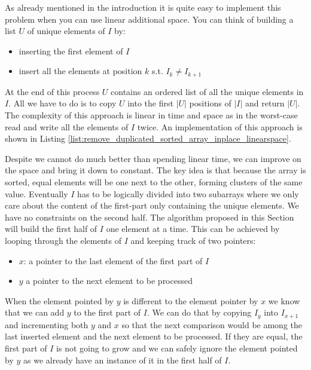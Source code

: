 As already mentioned in the introduction it is quite easy to implement this problem when you can use
linear additional space. You can think of building a list $U$ of unique elements of $I$ by:
\begin{itemize}
	\item inserting the first element of $I$
	\item insert all the elements at position $k$ s.t. $I_k \neq I_{k+1}$
\end{itemize}
At the end of this process $U$ contains an ordered list of all the unique elements in $I$. All we
have to do is to copy $U$ into the first $|U|$ positions of $|I|$ and return $|U|$. The complexity
of this approach is linear in time and space as in the worst-case read and write all the elements of
$I$ twice. An implementation of this approach is shown in Listing
\ref{list:remove_duplicated_sorted_array_inplace_linearspace}.

\begin{minipage}{\linewidth}
	
\end{minipage}

Despite we cannot do much better than spending linear time, we can improve on the space and bring it
down to constant. The key idea is that because the array is sorted, equal elements will be one next
to the other, forming clusters of the same value. Eventually $I$ has to be logically divided into
two subarrays where we only care about the content of the first-part only containing the unique
elements. We have no constraints on the second half. The algorithm proposed in this Section will
build the first half of $I$ one element at a time.  This can be achieved by looping through the
elements of $I$ and keeping track of two pointers:
\begin{itemize}
	\item $x$: a pointer to the last element of the first part of $I$
	\item $y$ a pointer to the next element to be processed 
\end{itemize}
When the element pointed by $y$ is different to the element pointer by $x$ we know that we can add
$y$ to the first part of $I$. We can do that by copying $I_y$ into $I_{x+1}$ and incrementing both
$y$ and $x$ so that the next comparison would be among the last inserted element and the next
element to be processed. If they are equal, the first part of $I$ is not going to grow and we can
safely ignore the element pointed by $y$ as we already have an instance of it in the first half of
$I$.

